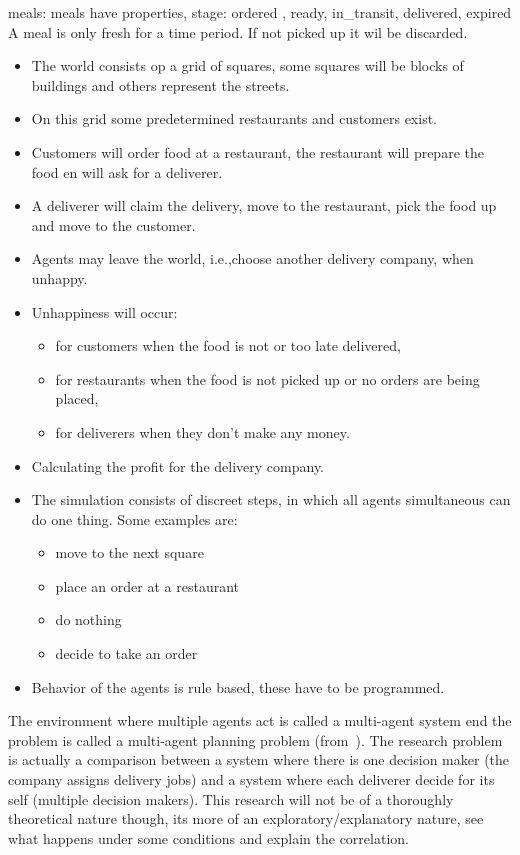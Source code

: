 meals:
meals have properties, stage: ordered , ready, in\_transit, delivered, expired
A meal is only fresh for a time period.
If not picked up it wil be discarded.





\begin{itemize}
    \item   The world consists op a grid of squares, some squares will be blocks of buildings and others represent the streets.
    \item   On this grid some predetermined restaurants and customers exist.
    \item   Customers will order food at a restaurant, the restaurant will prepare the food en will ask for a deliverer.
    \item   A deliverer will claim the delivery, move to the restaurant, pick the food up and move to the customer.
    \item   Agents may leave the world, i.e.,choose another delivery company, when unhappy.
    \item   Unhappiness will occur:
    \begin{itemize}
        \item   for customers when the food is not or too late delivered,
        \item   for restaurants when the food is not picked up or no orders are being placed,
        \item   for deliverers when they don't make any money.
    \end{itemize}
    \item    Calculating the profit for the delivery company.
    \item    The simulation consists of discreet steps, in which all agents simultaneous can do one thing.
    Some examples are:
    \begin{itemize}
        \item  move to the next square
        \item  place an order at a restaurant
        \item  do nothing
        \item  decide to take an order
    \end{itemize}
    \item   Behavior of the agents is rule based, these have to be programmed.
\end{itemize}


The environment where multiple agents act is called a multi-agent system end the problem is called a multi-agent planning problem (from~\cite{russell2016artificial}).
The research problem is actually a comparison between a system where there is one decision maker (the company assigns delivery jobs) and a system where each deliverer decide for its self (multiple decision makers).
This research will not be of a thoroughly theoretical nature though, its more of an exploratory/explanatory nature, see what happens under some conditions and explain the correlation.

